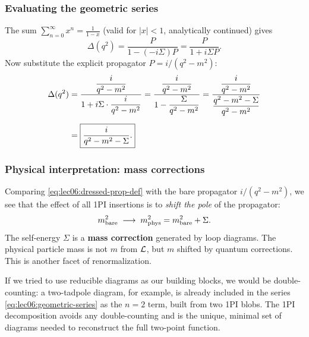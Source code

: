 \documentclass[../main.tex]{subfiles}
\begin{document}
\subsubsection*{Evaluating the geometric series}

The sum $\sum_{n=0}^\infty x^n = \frac{1}{1-x}$ (valid for $|x|<1$, analytically continued) gives
\begin{equation}
  \Delta(q^2)
  = \frac{P}{1 - (-i\Sigma)P}
  = \frac{P}{1 + i\Sigma P}.
  \label{eq:lec06:geo-result}
\end{equation}
Now substitute the explicit propagator $P = i/(q^2-m^2)$:
\begin{align}
  \Delta(q^2)
  &= \frac{\dfrac{i}{q^2 - m^2}}{1 + i\Sigma \cdot \dfrac{i}{q^2-m^2}}
  = \frac{\dfrac{i}{q^2-m^2}}{1 - \dfrac{\Sigma}{q^2-m^2}}
  = \frac{\dfrac{i}{q^2-m^2}}{\dfrac{q^2-m^2-\Sigma}{q^2-m^2}} \notag\\[6pt]
  &= \boxed{\frac{i}{q^2 - m^2 - \Sigma}.}
  \label{eq:lec06:dressed-propagator}
\end{align}


\subsubsection*{Physical interpretation: mass corrections}

Comparing \eqref{eq:lec06:dressed-prop-def} with the bare propagator $i/(q^2-m^2)$, we see that the effect of all 1PI insertions is to \emph{shift the pole} of the propagator:
\begin{equation}
  m_{\rm bare}^2 \;\longrightarrow\; m_{\rm phys}^2 = m_{\rm bare}^2 + \Sigma.
  \label{eq:lec06:mass-shift}
\end{equation}
The self-energy $\Sigma$ is a \textbf{mass correction} generated by loop diagrams.  The physical particle mass is not $m$ from $\mathcal{L}$, but $m$ shifted by quantum corrections.  This is another facet of renormalization.

\begin{remark}
If we tried to use reducible diagrams as our building blocks, we would be double-counting: a two-tadpole diagram, for example, is already included in the series \eqref{eq:lec06:geometric-series} as the $n=2$ term, built from two 1PI blobs.  The 1PI decomposition avoids any double-counting and is the unique, minimal set of diagrams needed to reconstruct the full two-point function.
\end{remark}
\end{document}
